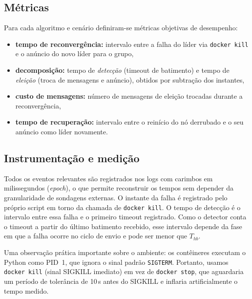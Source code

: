 \documentclass[journal]{IEEEtran}
\begin{document}
\subsection{Métricas}
Para cada algoritmo e cenário definiram-se métricas objetivas de desempenho:
\begin{itemize}
    \item \textbf{tempo de reconvergência:} intervalo entre a falha do líder via \texttt{docker kill} e o anúncio do novo líder para o grupo,
    \item \textbf{decomposição:} tempo de \emph{detecção} (timeout de batimento) e tempo de \emph{eleição} (troca de mensagens e anúncio), obtidos por subtração dos instantes,
    \item \textbf{custo de mensagens:} número de mensagens de eleição trocadas durante a reconvergência,
    \item \textbf{tempo de recuperação:} intervalo entre o reinício do nó derrubado e o seu anúncio como líder novamente.
\end{itemize}

\subsection{Instrumentação e medição}
Todos os eventos relevantes são registrados nos logs com carimbos em milissegundos (\emph{epoch}), o que permite reconstruir os tempos sem depender da granularidade de sondagens externas. O instante da falha é registrado pelo próprio script em torno da chamada de \texttt{docker kill}. O tempo de detecção é o intervalo entre essa falha e o primeiro timeout registrado. Como o detector conta o timeout a partir do último batimento recebido, esse intervalo depende da fase em que a falha ocorre no ciclo de envio e pode ser menor que $T_{hb}$. 

Uma observação prática importante sobre o ambiente: os contêineres executam o Python como PID~1, que ignora o sinal padrão \texttt{SIGTERM}. Portanto, usamos \texttt{docker kill} (sinal SIGKILL imediato) em vez de \texttt{docker stop}, que aguardaria um período de tolerância de 10\,s antes do SIGKILL e inflaria artificialmente o tempo medido.
\end{document}
